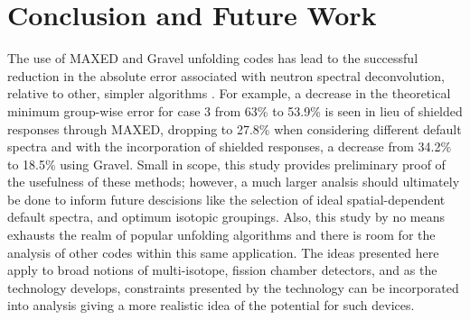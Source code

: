 \documentclass[journal]{IEEEtran}
\begin{document}
\section{Conclusion and Future Work}

The use of MAXED and Gravel unfolding codes has lead to the successful reduction in the absolute error associated with neutron spectral deconvolution, relative to other, simpler algorithms \cite{roberts2018use}.
For example, a decrease in the theoretical minimum group-wise error for case 3 from 63\% to 53.9\% is seen in lieu of shielded responses through MAXED, dropping to 27.8\% when considering different default spectra and with the incorporation of shielded responses, a decrease from 34.2\% to 18.5\% using Gravel.
Small in scope, this study provides preliminary proof of the usefulness of these methods; however, a much larger analsis should ultimately be done to inform future descisions like the selection of ideal spatial-dependent default spectra, and optimum isotopic groupings.
Also, this study by no means exhausts the realm of popular unfolding algorithms and there is room for the analysis of other codes within this same application.
The ideas presented here apply to broad notions of multi-isotope, fission chamber detectors, and as the technology develops, constraints presented by the technology can be incorporated into analysis giving a more realistic idea of the potential for such devices.

 


\ifCLASSOPTIONcaptionsoff
  \newpage
\fi






%
%
\end{document}
